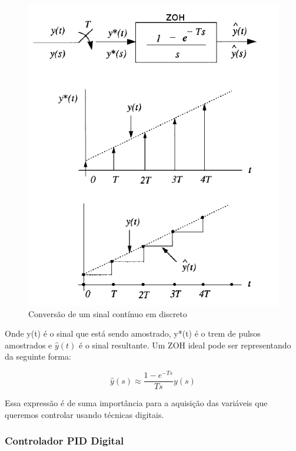 \begin{figure}[H]
  \caption{Conversão de um sinal contínuo em discreto}
  \begin{center}
      \includegraphics[scale=0.65]{referencial/img/zoh_wie_p155}
  \end{center}
  \label{fig:zoh_wie_p155}
\end{figure}

Onde y(t) é o sinal que está sendo amostrado, y*(t) é o trem de pulsos amostrados e $\hat{y}(t)$ é o sinal resultante. Um ZOH ideal pode ser representando da seguinte forma:

\begin{equation}
  \hat{y}(s) \approx \frac{1-e^{-Ts}}{Ts}y(s)
\end{equation}

Essa expressão é de suma importância para a aquisição das variáveis que queremos controlar usando técnicas digitais.


\subsubsection{Controlador PID Digital}

